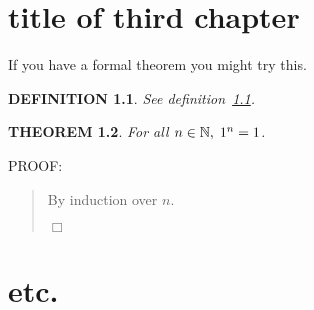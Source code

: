 \documentclass{report}
\newtheorem{theorem}{THEOREM}
\newtheorem{definition}[theorem]{DEFINITION}
\newenvironment{proof}{
PROOF:
\begin{quotation}}{
$\Box$ \end{quotation}}
\newcommand{\nats}{\mbox{\( \mathbb N \)}}
\numberwithin{equation}{section}
\numberwithin{figure}{section}
\numberwithin{table}{section}
\begin{document}
\chapter{title of third chapter}
If you have a formal theorem you might try this.
\begin{definition}\label{def}
See definition~\ref{def}.
\end{definition}
\begin{theorem}
For all $n\in\nats,\; 1^n=1$.
\end{theorem}
\begin{proof}
By induction over $n$.
\end{proof}

\chapter{etc.}
\appendix



\end{document}
